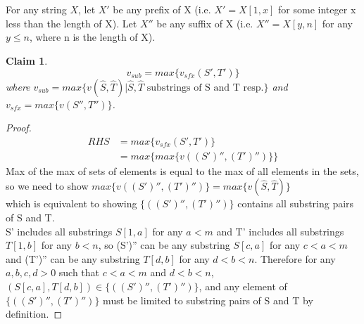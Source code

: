 \documentclass{article}
\newtheorem{claim}[theorem]{Claim}
\begin{document}
	
	
	\section{}
	For any string $ X $, let $ X' $ be any prefix of X (i.e. $ X' = X[1, x] $ for some integer x less than the length of X). Let $ X'' $ be any suffix of X (i.e. $ X'' = X[y, n] $ for any $ y \leq n $, where n is the length of X).
	
	\begin{claim}
		 \begin{equation}
		 	v_{sub} = max\{v_{sfx}(S', T')\} 
		 \label{q9_eqn}
		 \end{equation}
		where $ v_{sub} = max\{v(\hat{S}, \hat{T})|\hat{S}, \hat{T} \text{ substrings of S and T resp.}\} $ and $ v_{sfx} = max\{v(S'', T'')\} $.
	\end{claim}

	\begin{proof}
		\begin{align}
			RHS & = max\{v_{sfx}(S', T')\}\\
			& = max\{max\{v((S')'', (T')'')\}\}
		\end{align}
		Max of the max of sets of elements is equal to the max of all elements in the sets, so we need to show $ max \{v((S')'', (T')'')\} = max\{v(\hat{S}, \hat{T})\} $\\
		which is equivalent to showing $ \{((S')'', (T')'')\} $ contains all substring pairs of S and T.\\
		
		S' includes all substrings $ S[1, a] $ for any $ a < m $ and T' includes all substrings $ T[1, b] $ for any $ b < n $, so (S')'' can be any substring $ S[c, a] $ for any $ c<a<m $ and (T')'' can be any substring $ T[d, b] $ for any $ d < b < n $. Therefore for any $ a, b, c, d > 0$ such that $ c<a<m $ and $ d<b<n $, $ (S[c, a], T[d, b]) \in \{((S')'', (T')'')\} $, and any element of $\{((S')'', (T')'')\} $ must be limited to substring pairs of S and T by definition.
	\end{proof}

\end{document}
